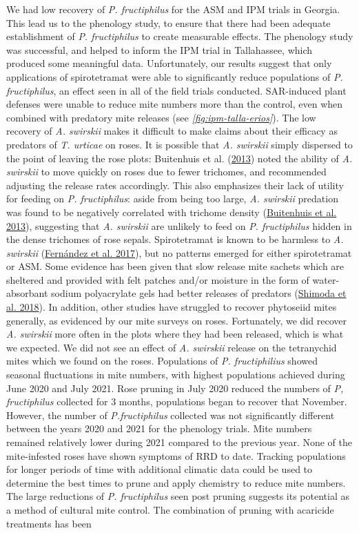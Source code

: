 \documentclass{ufdissertation}[overrideChapters] %
\begin{document}
{We had low recovery of \emph{P. fructiphilus} for the ASM and IPM trials in Georgia. This lead us to the phenology study, to ensure that there had been adequate establishment of \emph{P. fructiphilus} to create measurable effects. The phenology study was successful, and helped to inform the IPM trial in Tallahassee, which produced some meaningful data. Unfortunately, our results suggest that only applications of spirotetramat were able to significantly reduce populations of \emph{P. fructiphilus}, an effect seen in all of the field trials conducted. SAR-induced plant defenses were unable to reduce mite numbers more than the control, even when combined with predatory mite releases (see \emph{\ref{fig:ipm-talla-erios}}). The low recovery of \emph{A. swirskii} makes it difficult to make claims about their efficacy as predators of \emph{T. urticae} on roses. It is possible that \emph{A. swirskii} simply dispersed to the point of leaving the rose plots: Buitenhuis et al. (\protect\hyperlink{ref-Buitenhuis2013}{2013}) noted the ability of \emph{A. swirskii} to move quickly on roses due to fewer trichomes, and recommended adjusting the release rates accordingly. This also emphasizes their lack of utility for feeding on \emph{P. fructiphilus}: aside from being too large, \emph{A. swirskii} predation was found to be negatively correlated with trichome density (\protect\hyperlink{ref-Buitenhuis2013}{Buitenhuis et al. 2013}), suggesting that \emph{A. swirskii} are unlikely to feed on \emph{P. fructiphilus} hidden in the dense trichomes of rose sepals. Spirotetramat is known to be harmless to \emph{A. swirskii} (\protect\hyperlink{ref-Fernandez2017}{Fernández et al. 2017}), but no patterns emerged for either spirotetramat or ASM. Some evidence has been given that slow release mite sachets which are sheltered and provided with felt patches and/or moisture in the form of water-absorbant sodium polyacrylate gels had better releases of predators (\protect\hyperlink{ref-Shimoda2018}{Shimoda et al. 2018}). In addition, other studies have struggled to recover phytoseiid mites generally, as evidenced by our mite surveys on roses. Fortunately, we did recover \emph{A. swirskii} more often in the plots where they had been released, which is what we expected. We did not see an effect of \emph{A. swirskii} release on the tetranychid mites which we found on the roses. Populations of \emph{P. fructiphilius} showed seasonal fluctuations in mite numbers, with highest populations achieved during June 2020 and July 2021. Rose pruning in July 2020 reduced the numbers of \emph{P, fructiphilus} collected for 3 months, populations began to recover that November. However, the number of \emph{P.fructiphilus} collected was not significantly different between the years 2020 and 2021 for the phenology trials. Mite numbers remained relatively lower during 2021 compared to the previous year. None of the mite-infested roses have shown symptoms of RRD to date. Tracking populations for longer periods of time with additional climatic data could be used to determine the best times to prune and apply chemistry to reduce mite numbers. The large reductions of \emph{P. fructiphilus} seen post pruning suggests its potential as a method of cultural mite control. The combination of pruning with acaricide treatments has been }
\end{document}
